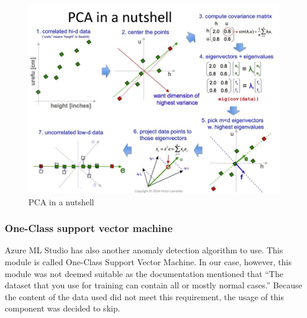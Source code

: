 \begin{figure}[htb]
    \centering
    \includegraphics[width=150mm]{./appendices/pca-nutshell.jpeg}
    \caption{PCA in a nutshell
        \label{fig:pca-nutshell}}
\end{figure}


\subsubsection*{One-Class support vector machine}

Azure ML Studio has also another anomaly detection algorithm to use.
This module is called One-Class Support Vector Machine.
In our case, however,
this module was not deemed suitable
as the documentation mentioned that
\enquote{The dataset that you use for training
can contain all or mostly normal cases.}
Because the content of the data used did not meet this requirement,
the usage of this component was decided to skip.



